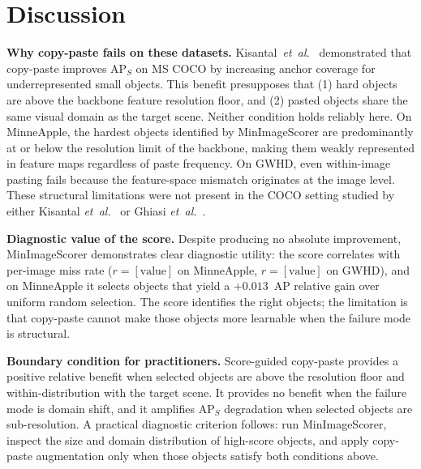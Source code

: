 \documentclass[conference]{IEEEtran}
\begin{document}
\section{Discussion}

\textbf{Why copy-paste fails on these datasets.}
Kisantal~\textit{et~al.}~\cite{kisantal2019augmentation} demonstrated
that copy-paste improves AP$_S$ on MS COCO by increasing anchor
coverage for underrepresented small objects. This benefit presupposes
that (1) hard objects are above the backbone feature resolution floor,
and (2) pasted objects share the same visual domain as the target
scene. Neither condition holds reliably here. On MinneApple, the
hardest objects identified by MinImageScorer are predominantly
at or below the resolution limit of the backbone, making them weakly
represented in feature maps regardless of paste frequency. On GWHD,
even within-image pasting fails because the feature-space mismatch
originates at the image level. These structural limitations were not
present in the COCO setting studied by either Kisantal
\textit{et~al.}~\cite{kisantal2019augmentation} or Ghiasi
\textit{et~al.}~\cite{ghiasi2021simple}.

\textbf{Diagnostic value of the score.}
Despite producing no absolute improvement, MinImageScorer demonstrates
clear diagnostic utility: the score correlates with per-image miss
rate
($r{=}[\text{value}]$ on MinneApple, $r{=}[\text{value}]$ on GWHD),
and on MinneApple it selects objects that yield a $+0.013$~AP
relative gain over uniform random selection. The score identifies the
right objects; the limitation is that copy-paste cannot make those
objects more learnable when the failure mode is structural.

\textbf{Boundary condition for practitioners.}
Score-guided copy-paste provides a positive relative benefit when
selected objects are above the resolution floor and within-distribution
with the target scene. It provides no benefit when the failure mode
is domain shift, and it amplifies AP$_S$ degradation when selected
objects are sub-resolution. A practical diagnostic criterion follows:
run MinImageScorer, inspect the size and domain distribution of
high-score objects, and apply copy-paste augmentation only when
those objects satisfy both conditions above.
\end{document}
